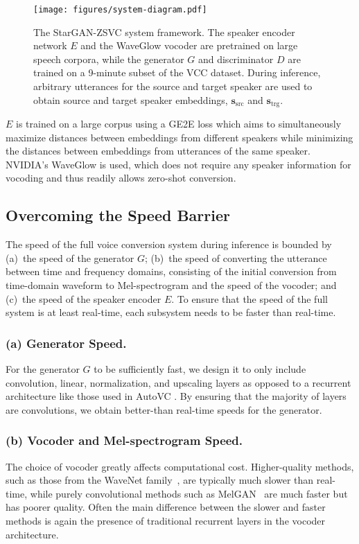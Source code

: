 \begin{figure}[!t]
\texttt{[image: figures/system-diagram.pdf]}
\caption{The StarGAN-ZSVC system framework. The speaker encoder network $E$ and the WaveGlow vocoder are pretrained on large speech corpora, while the generator $G$ and discriminator $D$ are trained on a 9-minute subset of the VCC dataset. During inference, arbitrary utterances for the source and target speaker are used to obtain source and target speaker embeddings, $\mathbf{s}_{\textrm{src}}$ and $\mathbf{s}_{\textrm{trg}}$. 
} \label{fig:system-diagram}
\end{figure}

$E$ is trained on a large corpus 
using a GE2E loss \cite{GE2E} which aims to simultaneously maximize distances between embeddings from different speakers while minimizing the distances between embeddings from utterances of the same speaker.
NVIDIA's WaveGlow \cite{waveglow} is used, which does not require any speaker information for vocoding and thus readily allows zero-shot conversion.

\subsection{Overcoming the Speed Barrier}
The speed of the full voice conversion system during inference is bounded by 
(a)~the speed of the generator $G$; 
(b)~the speed of converting the utterance between time and frequency domains, consisting of the initial conversion from time-domain waveform to Mel-spectrogram and the speed of the vocoder; 
and (c)~the speed of the speaker encoder $E$.
To ensure that the speed of the full system is at least real-time, each subsystem needs to be
faster than real-time.

\subsubsection{(a) Generator Speed.}
For the generator $G$ to be sufficiently fast, we design it to only include convolution, linear, normalization, and upscaling layers as opposed to a recurrent architecture like those used in AutoVC \cite{autovc}. 
By ensuring that the majority of layers are convolutions, we obtain better-than real-time speeds for the generator.

\subsubsection{(b) Vocoder and Mel-spectrogram Speed.} 
The choice of vocoder greatly affects computational cost. 
Higher-quality methods, such as those from the WaveNet family~\cite{wavenet}, are typically much slower than real-time, while purely convolutional methods such as MelGAN~\cite{MelGAN} are much faster 
but has poorer quality.
Often the main difference between the slower and faster methods is again the presence of traditional recurrent layers in the vocoder architecture. 

